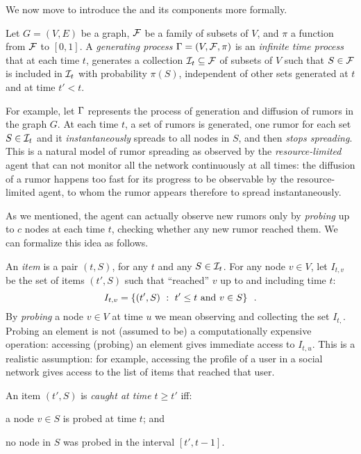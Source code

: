 We now move to introduce the \probname and its components more formally.

\begin{definition}\label{def:generating}
	Let $G=(V,E)$ be a graph, $\mathcal{F}$ be a family of subsets of $V$, and $\pi$ a
	function from $\mathcal{F}$ to $[0,1]$. A \emph{generating process} $\Gamma =
	(V,\mathcal{F},\pi)$ is an \emph{infinite time process} that at each time $t$,
	generates a collection $\mathcal{I}_t\subseteq\mathcal{F}$ of subsets of $V$ such that $S\in
	\mathcal{F}$ is included in $\mathcal{I}_t$ with probability $\pi(S)$, independent of other
	sets generated at $t$ and at time $t'<t$.
\end{definition}

For example, let $\Gamma$ represents the process of generation and diffusion of
rumors in the graph $G$. At each time $t$, a set of rumors is generated, one
rumor for each set $S\in\mathcal{I}_t$ and it \emph{instantaneously} spreads to all
nodes in $S$, and then \emph{stops spreading}. This is a natural model of rumor
spreading as observed by the \emph{resource-limited} agent that can not monitor
all the network continuously at all times: the diffusion of a rumor happens too
fast for its progress to be observable by the resource-limited agent, to whom
the rumor appears therefore to spread instantaneously.

As we mentioned, the agent can actually observe new rumors only by
\emph{probing} up to $c$ nodes at each time $t$, checking whether any new
rumor reached them. We can formalize this idea as follows.

An \emph{item} is a pair $(t,S)$, for any $t$ and any $S\in\mathcal{I}_t$. For any
node $v\in V$, let $I_{t,v}$ be the set of items $(t',S)$ such that ``reached''
$v$ up to and including time $t$:
\[
	I_{t,v}=\left\{(t',S) ~:~ t'\le t \mbox{ and } v\in S\right\}\enspace.
\]
By \emph{probing} a node $v\in V$ at time $u$ we mean observing and
collecting the set $I_{t,}$. Probing an element is not (assumed to be) a
computationally expensive operation: accessing (probing) an element gives
immediate access to $I_{t,u}$. This is a realistic assumption: for example,
accessing the profile of a user in a social network gives access to the list of
items that reached that user.

An item $(t',S)$ is \emph{caught at time $t\geq t'$} iff:
\begin{enumerate*}
	\item a node $v\in S$ is probed at time $t$; and
	\item no node in $S$ was probed in the interval $[t',t-1]$.
\end{enumerate*}

